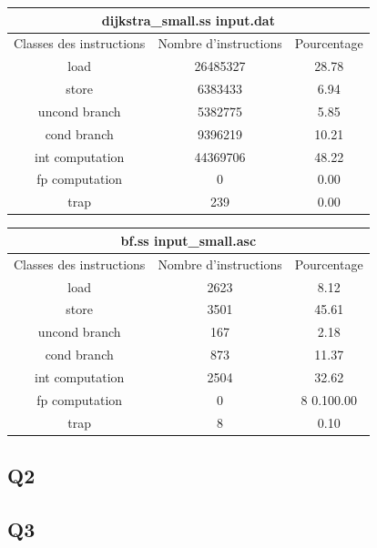 \documentclass[a4paper]{article}
\theoremstyle{plain}
\begin{document}
			\begin{table}[!htbp]
			\centering
			\begin{tabular}{|c|c|c|}
			\hline
			\multicolumn{3}{|c|}{dijkstra\_small.ss input.dat}\\
			\hline
			Classes des instructions&Nombre d’instructions&Pourcentage\\
			\hline
			load& 				26485327&	28.78\\
			\hline
			store& 				6383433&	6.94\\
			\hline
			uncond branch& 		5382775&	5.85\\
			\hline
			cond branch& 		9396219& 	10.21\\
			\hline
			int computation& 	44369706& 	48.22\\
			\hline
			fp computation&		0& 			0.00\\
			\hline
			trap& 				239& 		0.00\\
			\hline
			\end{tabular}
			\end{table}
		

			\begin{table}[!htbp]
			\centering
			\begin{tabular}{|c|c|c|}
			\hline
			\multicolumn{3}{|c|}{bf.ss input\_small.asc}\\
			\hline
			Classes des instructions&Nombre d’instructions&Pourcentage\\
			\hline
			load& 				2623& 		8.12\\
			\hline
			store& 				3501& 		45.61\\
			\hline
			uncond branch& 		167&		2.18\\
			\hline
			cond branch& 		873&		11.37\\
			\hline
			int computation& 	2504&		32.62\\
			\hline
			fp computation&		0& 			8	0.100.00\\
			\hline
			trap& 				8&			0.10\\
			\hline
			\end{tabular}
			\end{table}

		\subsection{Q2}
		

		\subsection{Q3}
		
\end{document}
